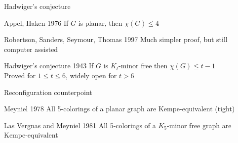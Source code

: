 \documentclass[11pt,xcolor=dvipsnames,presentation]{beamer}
\begin{document}
\begin{frame}{Hadwiger's conjecture}

  \begin{block}{Appel, Haken 1976}
    If $G$ is planar, then $\chi(G) \le 4$
  \end{block}

  \begin{block}{Robertson, Sanders, Seymour, Thomas 1997}
    Much simpler proof, but still computer assisted 
  \end{block}
  
  \begin{alertblock}{Hadwiger's conjecture 1943}
    If $G$ is $K_t$-minor free then $\chi(G) \le t-1$\\
    Proved for $1 \le t \le 6$, widely open for $t > 6$
  \end{alertblock}
\end{frame}

\begin{frame}{Reconfiguration counterpoint}

  \begin{block}{Meyniel 1978}
    All 5-colorings of a planar graph are Kempe-equivalent (tight)
  \end{block}

  \begin{block}{Las Vergnas and Meyniel 1981}
    All 5-colorings of a $K_5$-minor free graph are Kempe-equivalent
  \end{block}

\end{frame}
\end{document}

